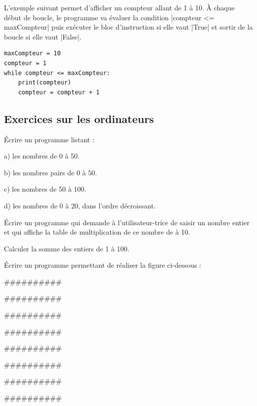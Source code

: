 \documentclass[11pt, a4paper]{book}
\begin{document}
\begin{example}
\label{ex:counter}
L'exemple suivant permet d'afficher un compteur allant de 1 à 10. À chaque début de boucle, le programme va évaluer la condition |compteur <= maxCompteur| puis exécuter le bloc d'instruction si elle vaut |True| et sortir de la boucle si elle vaut |False|.
\end{example}

\begin{lstlisting}
maxCompteur = 10
compteur = 1
while compteur <= maxCompteur:
    print(compteur)
    compteur = compteur + 1
\end{lstlisting}






\subsection{Exercices sur les ordinateurs}

\begin{exercice}
Écrire un programme listant :
\item[a)] les nombres de 0 à 50.
\item[b)] les nombres pairs de 0 à 50.
\item[c)] les nombres de 50 à 100.
\item[d)] les nombres  de 0 à 20, dans l'ordre décroissant.
\end{exercice}

\begin{exercice}
Écrire un programme qui demande à l'utilisateur-trice de saisir un nombre entier et qui affiche la table de multiplication de ce nombre de à 10.
\end{exercice}


\begin{exercice}
Calculer la somme des entiers de 1 à 100.
\end{exercice}

\begin{exercice}
Écrire un programme permettant de réaliser la figure ci-dessous :

\#\#\#\#\#\#\#\#\#\#

\#\#\#\#\#\#\#\#\#\#

\#\#\#\#\#\#\#\#\#\#

\#\#\#\#\#\#\#\#\#\#

\#\#\#\#\#\#\#\#\#\#

\#\#\#\#\#\#\#\#\#\#

\#\#\#\#\#\#\#\#\#\#

\#\#\#\#\#\#\#\#\#\#
\end{exercice}
\end{document}
